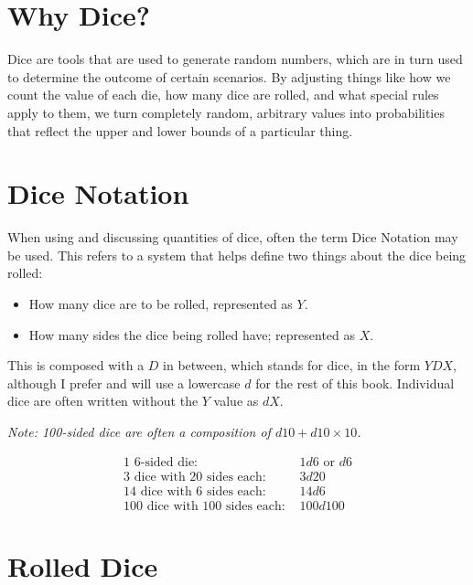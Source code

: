\documentclass[../main.tex]{subfiles}
\begin{document}
    \section{Why Dice?}

    Dice are tools that are used to generate random numbers, which are in turn used to determine the outcome of certain scenarios. By adjusting things like how we count the value of each die, how many dice are rolled, and what special rules apply to them, we turn completely random, arbitrary values into probabilities that reflect the upper and lower bounds of a particular thing.

    \section{Dice Notation}

    When using and discussing quantities of dice, often the term Dice Notation may be used. This refers to a system that helps define two things about the dice being rolled:

    \begin{itemize}
        \item How many dice are to be rolled, represented as $Y$.
        \item How many sides the dice being rolled have; represented as $X$.
    \end{itemize}

    This is composed with a $D$ in between, which stands for dice, in the form $YDX$, although I prefer and will use a lowercase $d$ for the rest of this book. Individual dice are often written without the $Y$ value as $dX$. 
    
    \emph{Note: 100-sided dice are often a composition of $d10+d10\times10$.}
    \begin{mdframed}[style=Arrata]
        \begin{align*}
            \text{1 6-sided die: }                  & 1d6 \text{ or } d6    \\
            \text{3 dice with 20 sides each: }      & 3d20                  \\
            \text{14 dice with 6 sides each: }      & 14d6                  \\
            \text{100 dice with 100 sides each: }   & 100d100
        \end{align*}
    \end{mdframed}

    \section{Rolled Dice}
\end{document}

